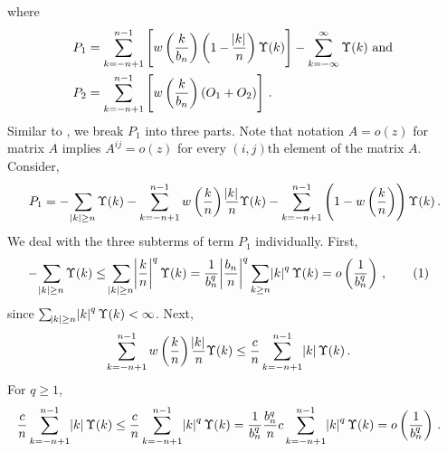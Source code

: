 \documentclass[12pt]{article}
\newcommand\numberthis{\addtocounter{equation}{1}\tag{\theequation}}
\theoremstyle{remark}
\begin{document}
%
where 
\begin{align*}
    P_1 &= \sum\limits_{k=-n+1}^{n-1}\left[w\left(\dfrac{k}{b_n}\right)\left(1-\dfrac{\abs{k}}{n}\right)\Upsilon(k) \right] - \sum\limits_{k=-\infty}^{\infty}\Upsilon(k) \textrm{ and }\\   
    P_2 &= \sum_{k=-n+1}^{n-1}\left[  w\left(\dfrac{k }{b_n}\right)\left(O_1 + O_2\right)\right]\,.
\end{align*}
%
%
Similar to \cite{hannan:1970}, we break $P_1$ into three parts. Note that notation $A = o(z)$ for matrix $A$  implies $A^{ij} = o(z)$ for every $(i,j)$th element of the matrix $A$. Consider,
\begin{equation}
\label{eq:P1_decomp}
P_1 = -\sum_{\abs{k}\geq n}\Upsilon(k)  -  \sum_{k = -n+1}^{n-1}w\left(\dfrac{k}{n}\right)\dfrac{\abs{k}}{n}\Upsilon(k)- \sum_{k = -n+1}^{n-1}\left(1-w\left(\dfrac{k}{n}\right)\right)\Upsilon(k)\,.  
\end{equation}
%
We deal with the three subterms of term $P_1$ individually. First,
%    
\begin{align*}
 {-\sum_{\abs{k}\geq n}\Upsilon(k)} &\leq  \sum_{\abs{k}\geq n} \abs{\dfrac{k}{n}}^q   \Upsilon(k) = \dfrac{1}{b_n^q}\abs{\dfrac{b_n}{n}}^q \sum_{k\geq n}\abs{k}^q  \Upsilon(k) = o\left(\dfrac{1}{b_n^q}\right)\,, \numberthis \label{eq:P1_first}
\end{align*}
%
since $\sum_{\abs{k}\geq n}\abs{k}^q \Upsilon(k)  < \infty$. Next,
%
\begin{align*}
 \sum_{k = -n+1}^{n-1}w\left(\dfrac{k}{n}\right)\dfrac{\abs{k}}{n}\Upsilon(k)   &\leq \dfrac{c}{n}\sum_{k = -n+1}^{n-1}\abs{k} \Upsilon(k)  \,.
\end{align*}
For $q\geq 1$,
\begin{align*}
\dfrac{c}{n}\sum_{k = -n+1}^{n-1}\abs{k}  \Upsilon(k) &\leq \dfrac{c}{n}\sum_{k = -n+1}^{n-1}\abs{k}^q  \Upsilon(k) = \dfrac{1}{b_n^q}\dfrac{b_n^q}{n} c\sum_{k = -n+1}^{n-1}\abs{k}^q  \Upsilon(k)  = o\left(\dfrac{1}{b_n^q}\right)\,.
\end{align*}
          
\end{document}
